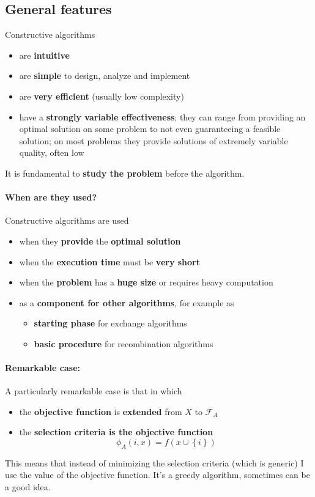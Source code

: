 \newpage

\subsection{General features}
Constructive algorithms
\begin{itemize}
	\item are \textbf{intuitive}
	\item are \textbf{simple} to design, analyze and implement
	\item are \textbf{very efficient} (usually low complexity)
	\item have a \textbf{strongly variable effectiveness}; they can range from providing an optimal solution on some problem to not even guaranteeing a feasible solution; on most problems they provide solutions of extremely variable quality, often low
\end{itemize}
It is fundamental to \textbf{study the problem} before the algorithm.\\

\paragraph{When are they used?} Constructive algorithms are used
\begin{itemize}
	\item when they \textbf{provide} the \textbf{optimal solution}
	\item when the \textbf{execution time} must be \textbf{very short} 
	\item when the \textbf{problem} has a \textbf{huge size} or requires heavy computation 
	\item as a \textbf{component for other algorithms}, for example as
	\begin{itemize}
		\item \textbf{starting phase} for exchange algorithms 
		\item \textbf{basic procedure} for recombination algorithms
	\end{itemize}
\end{itemize}

\paragraph{Remarkable case:} A particularly remarkable case is that in which
\begin{itemize}
	\item the \textbf{objective function} is \textbf{extended} from $X$ to $\mathcal{F}_A$
	\item the \textbf{selection criteria is the objective function}
	$$ \phi_A (i,x) = f\left(x \cup \left\{i\right\}\right) $$
\end{itemize}
This means that instead of minimizing the selection criteria (which is generic) I use the value of the objective function. It's a greedy algorithm, sometimes can be a good idea.\\

